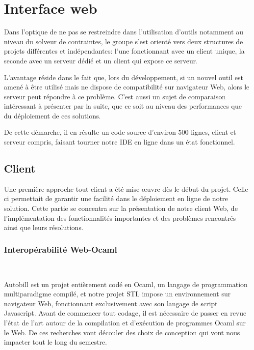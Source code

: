 \documentclass[12pt]{article}
\begin{document}
\newpage

\hypertarget{interface-web}{%
  \section{Interface web}\label{interface-web}}

Dans l'optique de ne pas se restreindre dans l'utilisation d'outils
notamment au niveau du solveur de contraintes, le groupe s'est orienté
vers deux structures de projets différentes et indépendantes: l'une
fonctionnant avec un client unique, la seconde avec un serveur dédié et
un client qui expose ce serveur.

L'avantage réside dans le fait que, lors du développement, si un nouvel
outil est amené à être utilisé mais ne dispose de compatibilité sur
navigateur Web, alors le serveur peut répondre à ce problème. C'est
aussi un sujet de comparaison intéressant à présenter par la suite, que
ce soit au niveau des performances que du déploiement de ces solutions.

De cette démarche, il en résulte un code source d'environ 500 lignes,
client et serveur compris, faisant tourner notre IDE en ligne dans un
état fonctionnel.

\subsection{Client}

Une première approche tout client a été mise œuvre dès le début du
projet. Celle-ci permettait de garantir une facilité dans le déploiement
en ligne de notre solution. Cette partie se concentra sur la présentation de 
notre client Web, de l'implémentation des fonctionnalités importantes et des problèmes rencontrés ainsi que leurs résolutions.

\subsubsection{Interopérabilité Web-Ocaml}\

Autobill est un projet entièrement codé en Ocaml, un langage de programmation multiparadigme compilé, et notre projet STL impose un environnement sur navigateur Web, fonctionnant exclusivement avec son langage de script Javascript. Avant de commencer tout codage, il est nécessaire de passer en revue l'état de l'art autour de la compilation et d'exécution de programmes Ocaml sur le Web. De ces recherches vont découler  des choix de conception qui vont nous impacter tout le long du semestre. \\
\end{document}
